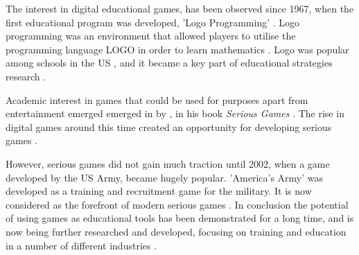 \documentclass[a4paper,11.5pt]{report}
\numberwithin{figure}{section}
\numberwithin{table}{section}
\numberwithin{equation}{section}
\numberwithin{equation}{section}
\begin{document}
The interest in digital educational games, has been observed since 1967, when the first educational program was developed, 'Logo Programming' \citep{hayes2008} . Logo programming was an environment that allowed players to utilise the programming language LOGO in order to learn mathematics \citep{feurzeig1969}. Logo was popular among schools in the US \citep{lehrer1986}, and it became a key part of educational strategies research \citep{hayes2008}. 

Academic interest in games that could be used for purposes apart from entertainment emerged emerged in \citeyear{abt1970} by \citeauthor{abt1970}, in his book \textit{Serious Games} \citep{Breuer2010}. The rise in digital games around this time created an opportunity for developing serious games \citep{Wilkinson2016}. 

However, serious games did not gain much traction until 2002, when a game developed by the US Army, became hugely popular. 'America's Army' was developed as a training and recruitment game for the military. It is now considered as the forefront of modern serious games \citep{Zyda2005, Wilkinson2016}. In conclusion the potential of using games as educational tools has been demonstrated for a long time, and is now being further researched and developed, focusing on training and education in a number of different industries \citep{Wilkinson2016}.


 


\end{document}
